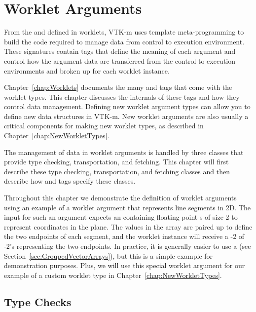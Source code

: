
\chapter{Worklet Arguments}
\label{chap:TransferringArguments}
\label{chap:WorkletArguments}

From the \controlsignature and \executionsignature defined in worklets, VTK-m uses template meta-programming to build the code required to manage data from control to execution environment.
These signatures contain tags that define the meaning of each argument and control how the argument data are transferred from the control to execution environments and broken up for each worklet instance.

Chapter~\ref{chap:Worklets} documents the many \controlsignature and \executionsignature tags that come with the worklet types.
This chapter discusses the internals of these tags and how they control data management.
Defining new worklet argument types can allow you to define new data structures in VTK-m.
New worklet arguments are also usually a critical components for making new worklet types, as described in Chapter~\ref{chap:NewWorkletTypes}.

The management of data in worklet arguments is handled by three classes that provide type checking, transportation, and fetching.
This chapter will first describe these type checking, transportation, and fetching classes and then describe how \controlsignature and \executionsignature tags specify these classes.

Throughout this chapter we demonstrate the definition of worklet arguments using an example of a worklet argument that represents line segments in 2D.
The input for such an argument expects an  containing floating point s of size 2 to represent coordinates in the plane.
The values in the array are paired up to define the two endpoints of each segment, and the worklet instance will receive a -2 of -2's representing the two endpoints.
In practice, it is generally easier to use a  (see Section~\ref{sec:GroupedVectorArrays}), but this is a simple example for demonstration purposes.
Plus, we will use this special worklet argument for our example of a custom worklet type in Chapter~\ref{chap:NewWorkletTypes}.


\section{Type Checks}
\label{sec:TypeChecks}

